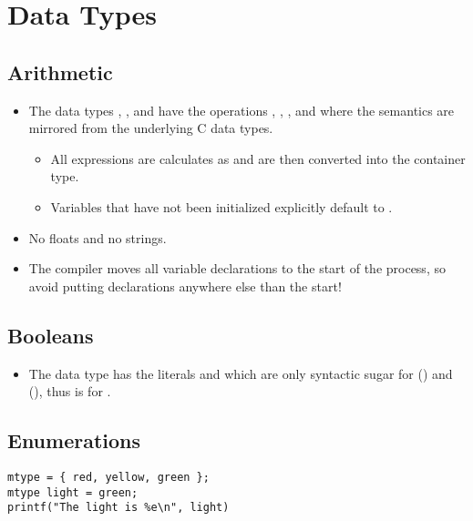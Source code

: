 	\section{Data Types}
		\subsection{Arithmetic}
			\begin{itemize}
				\item The data types , ,  and  have the operations \inlinePromela{+}, \inlinePromela{-}, \inlinePromela{*}, \inlinePromela{/} and \inlinePromela{\%} where the semantics are mirrored from the underlying C data types.
					\begin{itemize}
						\item All expressions are calculates as  and are then converted into the container type.
						\item Variables that have not been initialized explicitly default to .
					\end{itemize}
				\item No floats and no strings.
				\item The compiler moves all variable declarations to the start of the process, so avoid putting declarations anywhere else than the start!
			\end{itemize}

		\subsection{Booleans}
			\begin{itemize}
				\item The data type  has the literals  and  which are only syntactic sugar for  () and  (), thus is  for .
			\end{itemize}

		\subsection{Enumerations}
			\begin{lstlisting}[caption = { PROMELA Enumerations }, label = lst:promelaEnum, language = PROMELA]
mtype = { red, yellow, green };
mtype light = green;
printf("The light is %e\n", light)
			\end{lstlisting}
			

